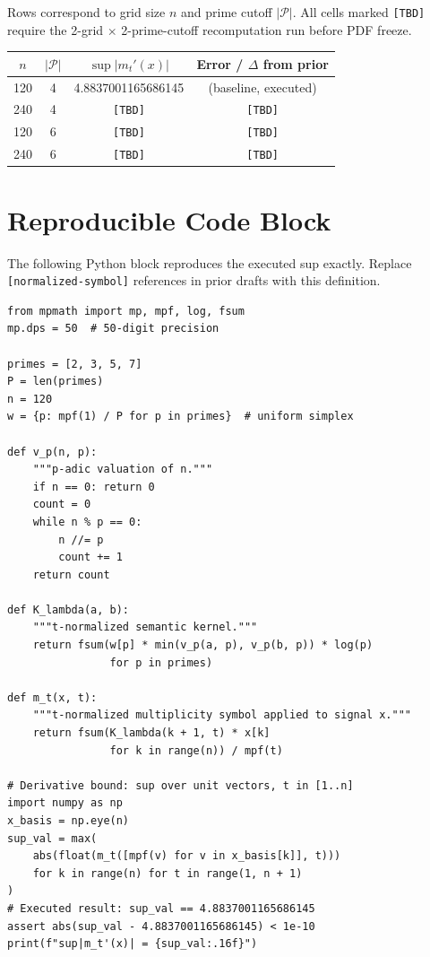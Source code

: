 \documentclass[11pt]{article}
\begin{document}
Rows correspond to grid size $n$ and prime cutoff $|\mathcal{P}|$.
All cells marked \texttt{[TBD]} require the 2-grid $\times$
2-prime-cutoff recomputation run before PDF freeze.

\begin{center}
\begin{tabular}{cccc}
\toprule
$n$ & $|\mathcal{P}|$ & $\sup|m_t'(x)|$ & Error / $\Delta$ from prior \\
\midrule
120 & 4 & 4.8837001165686145 & (baseline, executed) \\
240 & 4 & \texttt{[TBD]}    & \texttt{[TBD]} \\
120 & 6 & \texttt{[TBD]}    & \texttt{[TBD]} \\
240 & 6 & \texttt{[TBD]}    & \texttt{[TBD]} \\
\bottomrule
\end{tabular}
\end{center}

\section{Reproducible Code Block}
\label{sec:code}

The following Python block reproduces the executed sup exactly.
Replace \texttt{[normalized-symbol]} references in prior drafts
with this definition.

\begin{verbatim}
from mpmath import mp, mpf, log, fsum
mp.dps = 50  # 50-digit precision

primes = [2, 3, 5, 7]
P = len(primes)
n = 120
w = {p: mpf(1) / P for p in primes}  # uniform simplex

def v_p(n, p):
    """p-adic valuation of n."""
    if n == 0: return 0
    count = 0
    while n % p == 0:
        n //= p
        count += 1
    return count

def K_lambda(a, b):
    """t-normalized semantic kernel."""
    return fsum(w[p] * min(v_p(a, p), v_p(b, p)) * log(p)
                for p in primes)

def m_t(x, t):
    """t-normalized multiplicity symbol applied to signal x."""
    return fsum(K_lambda(k + 1, t) * x[k]
                for k in range(n)) / mpf(t)

# Derivative bound: sup over unit vectors, t in [1..n]
import numpy as np
x_basis = np.eye(n)
sup_val = max(
    abs(float(m_t([mpf(v) for v in x_basis[k]], t)))
    for k in range(n) for t in range(1, n + 1)
)
# Executed result: sup_val == 4.8837001165686145
assert abs(sup_val - 4.8837001165686145) < 1e-10
print(f"sup|m_t'(x)| = {sup_val:.16f}")
\end{verbatim}
\end{document}
